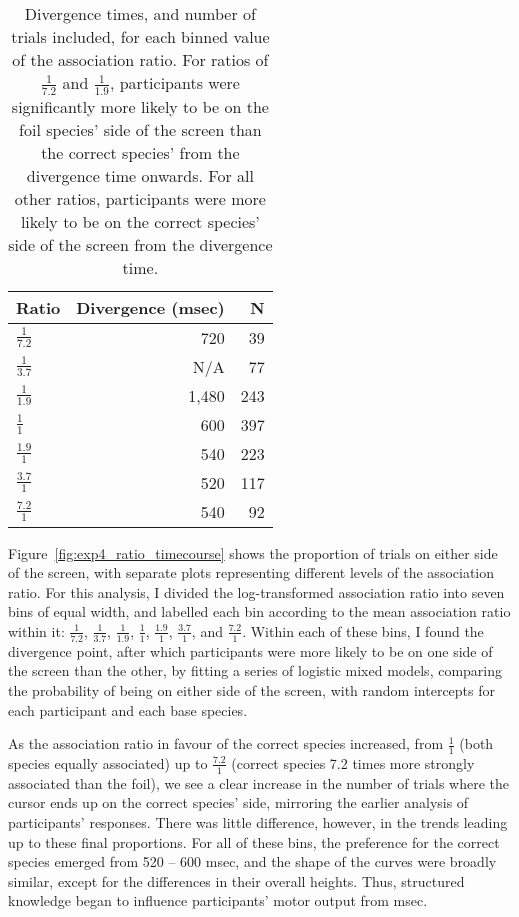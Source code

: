 \begin{table}
  \centering
  \caption[Divergence times, Experiment 4.]{
    Divergence times, and number of trials included,
    for each binned value of the association ratio.
    For ratios of $\frac{1}{7.2}$ and $\frac{1}{1.9}$,
    participants were significantly more likely to be on
    the foil species' side of the screen than the correct species'
    from the divergence time onwards.
    For all other ratios, participants were more likely to be on
    the correct species' side of the screen
    from the divergence time.
    \label{tab:exp4_ratio_timecourse_table}
  }
  \doublespacing
  \begin{tabular}{lrr}
    \toprule
    Ratio           & Divergence (msec) & N\\
    \midrule
    $\frac{1}{7.2}$ & 720               & 39\\
    $\frac{1}{3.7}$ & N/A               & 77\\
    $\frac{1}{1.9}$ & 1,480              & 243\\
    $\frac{1}{1}$   & 600               & 397\\
    $\frac{1.9}{1}$ & 540               & 223\\
    $\frac{3.7}{1}$ & 520               & 117\\
    $\frac{7.2}{1}$ & 540               & 92\\
    \bottomrule
  \end{tabular}
\end{table}

Figure~\ref{fig:exp4_ratio_timecourse}
shows the proportion of trials on either side of the screen,
with separate plots representing different levels of the association ratio.
For this analysis, I divided the log-transformed association ratio
into seven bins of equal width,
and labelled each bin according to the mean association ratio within it:
$\frac{1}{7.2}$, $\frac{1}{3.7}$, $\frac{1}{1.9}$, $\frac{1}{1}$, $  \frac{1.9}{1}$, $\frac{3.7}{1}$, and $\frac{7.2}{1}$.
Within each of these bins, I found the divergence point,
after which participants were more likely to be
on one side of the screen than the other,
by fitting a series of logistic mixed models,
comparing the probability of being on either side of the screen,
with random intercepts for each participant and each base species.

As the association ratio in favour of the correct species increased,
from $\frac{1}{1}$ (both species equally associated) up to $\frac{7.2}{1}$
(correct species 7.2 times more strongly associated than the foil),
we see a clear increase in the number of trials where
the cursor ends up on the correct species' side,
mirroring the earlier analysis of participants' responses.
There was little difference, however,
in the trends leading up to these final proportions.
For all of these bins, the preference for the correct species
emerged from 520 -- 600 msec,
and the shape of the curves were broadly similar,
except for the differences in their overall heights.
Thus, structured knowledge began to influence
participants' motor output from  msec.

